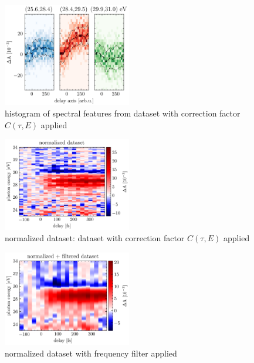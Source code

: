 \begin{figure}
	\centering
	\includegraphics[width=0.5\textwidth]{figures/chap3/corrected_hist.png}
	\caption{histogram of spectral features from dataset with correction factor $C(\tau,E)$ applied }
	\label{fig:corrected_hist}
\end{figure}

\begin{figure}
	\centering
	\includegraphics[width=0.5\textwidth]{figures/chap3/Ge_corrected_raw_spectrogram.png}
	\caption{normalized dataset: dataset with correction factor $C(\tau,E)$ applied }
	\label{fig:Ge_corrected_raw_spectrogram}
\end{figure}

\begin{figure}
	\centering
	\includegraphics[width=0.5\textwidth]{figures/chap3/Ge_corrected_filtered_spectrogram.png}
	\caption{normalized dataset with frequency filter applied }
	\label{fig:Ge_corrected_filtered_spectrogram}
\end{figure}


